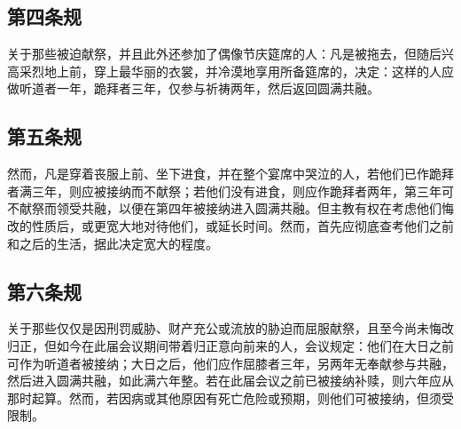 
\subsection{第四条规}

关于那些被迫献祭，并且此外还参加了偶像节庆筵席的人：凡是被拖去，但随后兴高采烈地上前，穿上最华丽的衣裳，并冷漠地享用所备筵席的，决定：这样的人应做听道者一年，跪拜者三年，仅参与祈祷两年，然后返回圆满共融。\par

\par


\subsection{第五条规}

然而，凡是穿着丧服上前、坐下进食，并在整个宴席中哭泣的人，若他们已作跪拜者满三年，则应被接纳而不献祭；若他们没有进食，则应作跪拜者两年，第三年可不献祭而领受共融，以便在第四年被接纳进入圆满共融。但主教有权在考虑他们悔改的性质后，或更宽大地对待他们，或延长时间。然而，首先应彻底查考他们之前和之后的生活，据此决定宽大的程度。\par


\subsection{第六条规}

关于那些仅仅是因刑罚威胁、财产充公或流放的胁迫而屈服献祭，且至今尚未悔改归正，但如今在此届会议期间带着归正意向前来的人，会议规定：他们在大日之前可作为听道者被接纳；大日之后，他们应作屈膝者三年，另两年无奉献参与共融，然后进入圆满共融，如此满六年整。若在此届会议之前已被接纳补赎，则六年应从那时起算。然而，若因病或其他原因有死亡危险或预期，则他们可被接纳，但须受限制。\par

\par

